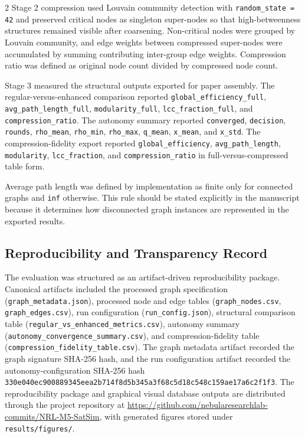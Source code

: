 \documentclass[fleqn,10pt,letterpaper]{article}
\begin{document}
\begin{multicols}{2}
Stage 2 compression used Louvain community detection with \texttt{random\_state = 42} and preserved critical nodes as singleton super-nodes so that high-betweenness structures remained visible after coarsening. Non-critical nodes were grouped by Louvain community, and edge weights between compressed super-nodes were accumulated by summing contributing inter-group edge weights. Compression ratio was defined as original node count divided by compressed node count.

Stage 3 measured the structural outputs exported for paper assembly. The regular-versus-enhanced comparison reported \texttt{global\_efficiency\_full}, \texttt{avg\_path\_length\_full}, \texttt{modularity\_full}, \texttt{lcc\_fraction\_full}, and \texttt{compression\_ratio}. The autonomy summary reported \texttt{converged}, \texttt{decision}, \texttt{rounds}, \texttt{rho\_mean}, \texttt{rho\_min}, \texttt{rho\_max}, \texttt{q\_mean}, \texttt{x\_mean}, and \texttt{x\_std}. The compression-fidelity export reported \texttt{global\_efficiency}, \texttt{avg\_path\_length}, \texttt{modularity}, \texttt{lcc\_fraction}, and \texttt{compression\_ratio} in full-versus-compressed table form.

Average path length was defined by implementation as finite only for connected graphs and \texttt{inf} otherwise. This rule should be stated explicitly in the manuscript because it determines how disconnected graph instances are represented in the exported results.


\subsection{Reproducibility and Transparency Record}

The evaluation was structured as an artifact-driven reproducibility package. Canonical artifacts included the processed graph specification (\texttt{graph\_metadata.json}), processed node and edge tables (\texttt{graph\_nodes.csv}, \texttt{graph\_edges.csv}), run configuration (\texttt{run\_config.json}), structural comparison table (\texttt{regular\_vs\_enhanced\_metrics.csv}), autonomy summary (\texttt{autonomy\_convergence\_summary.csv}), and compression-fidelity table (\texttt{compression\_fidelity\_table.csv}). The graph metadata artifact recorded the graph signature SHA-256 hash, and the run configuration artifact recorded the autonomy-configuration SHA-256 hash \texttt{330e040ec900889345eea2b714f8d5b345a3f68c5d18c548c159ae17a6c2f1f3}.
The reproducibility package and graphical visual database outputs are distributed through the project repository at \url{https://github.com/nebularesearchlab-commits/NRL-M5-SatSim}, with generated figures stored under \texttt{results/figures/}.


\end{multicols}
\end{document}
